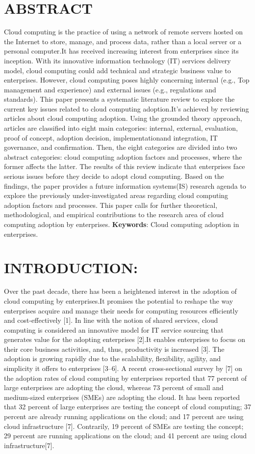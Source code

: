 \documentclass{article}                    %
\begin{document}
\section{ABSTRACT}
Cloud computing is  the practice of using a network of remote servers hosted on the Internet to store, manage, and process data, rather than a local server or a personal computer.It  has received increasing interest from enterprises since its inception. With its innovative information technology (IT) services delivery model, cloud computing could add technical and strategic business value
to enterprises. However, cloud computing poses highly concerning internal (e.g., Top management and experience) and external issues (e.g., regulations and standards). This paper presents a systematic literature review to explore the current key issues related to cloud computing adoption.It's achieved by reviewing articles about cloud computing adoption. Using the grounded theory approach, articles are classified into eight main categories: internal, external, evaluation, proof of concept, adoption decision, implementationand integration, IT governance, and confirmation. Then, the eight categories are divided into two abstract categories: cloud computing adoption factors and processes, where the former affects the latter. The results of this review indicate that enterprises face serious issues before they decide to adopt cloud computing. Based on the findings, the paper provides a future information systems(IS) research agenda to explore the previously under-investigated areas regarding cloud computing adoption factors and processes. This paper calls for further theoretical, methodological, and empirical contributions to the research area of cloud computing adoption by enterprises.
\newline
{\textbf{Keywords}}: Cloud computing  adoption in enterprises.
\section{INTRODUCTION:}
Over the past decade, there has been a heightened interest in the adoption of cloud computing by enterprises.It  promises the potential to reshape the way enterprises acquire and manage their needs for computing resources efficiently and cost-effectively [1]. In line with the notion of shared services, cloud computing is considered an innovative model for IT service sourcing that generates value for the adopting enterprises [2].It enables enterprises to focus on their core business activities, and, thus, productivity is increased [3]. The adoption is growing rapidly due to the scalability, flexibility, agility, and simplicity it offers to enterprises [3–6]. A recent cross-sectional survey by [7] on the adoption rates of cloud computing by enterprises reported that 77 percent of large enterprises are adopting the cloud, whereas 73 percent  of small and medium-sized enterprises (SMEs) are adopting the cloud. It has been reported that 32 percent of large enterprises are testing the concept of cloud computing; 37 percent are already running applications on the cloud; and 17 percent  are using cloud infrastructure [7]. Contrarily, 19 percent of SMEs are testing the concept; 29 percent are running applications on the cloud; and 41 percent  are using cloud infrastructure[7].
\end{document}
